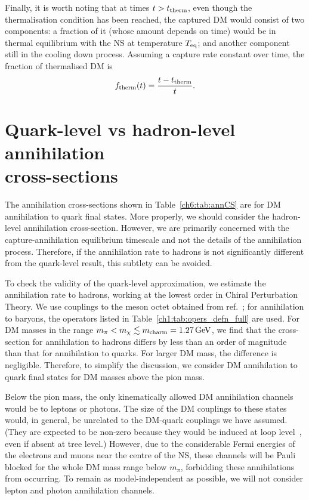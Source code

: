 Finally, it is worth noting that at times  $t>t_{\rm therm}$, even though the thermalisation condition has been reached, the captured DM would consist of two components: a fraction of it (whose amount depends on time) would be in thermal equilibrium with the NS at temperature $T_{\rm eq}$; and another component still in the cooling down process. Assuming a  capture rate constant over time, the fraction of thermalised DM is 
\begin{equation}
    f_{\rm therm}(t) = \frac{t-t_{\rm therm}}{t}.
\end{equation}




\section[Quark-level vs hadron-level annihilation cross-sections]{Quark-level vs hadron-level annihilation\\cross-sections}
\label{sec:quarkhadron}

The annihilation cross-sections shown in Table~\ref{ch6:tab:annCS} are for DM annihilation to quark final states.  More properly, we should consider the hadron-level annihilation cross-section.
However, we are primarily concerned with the capture-annihilation equilibrium timescale and not the details of the annihilation process. Therefore, if the annihilation rate to hadrons is not significantly different from the quark-level result, this subtlety can be avoided. 

To check the validity of the quark-level approximation, we estimate the annihilation rate to hadrons, working at the lowest order in Chiral Perturbation Theory. We use couplings to the meson octet obtained from  ref.~\cite{Kumar:2018heq_dec_IndirectDetectionSubGeV}; for annihilation to baryons, the operators listed in Table~\ref{ch1:tab:opers_defn_full} are used. 
For DM masses in the range $m_\pi < m_\chi \lesssim m_{\rm charm} = 1.27{\rm \,GeV}$, we find that the cross-section for annihilation to hadrons differs by less than an order of magnitude than that for annihilation to quarks. For larger DM mass, the difference is negligible. Therefore, to simplify the discussion, we consider DM annihilation to quark final states for DM masses above the pion mass.


Below the pion mass, the only kinematically allowed DM annihilation channels would be to leptons or photons. The size of the DM couplings to these states would, in general, be unrelated to the DM-quark couplings we have assumed. (They are expected to be non-zero because they would be induced at loop level~\cite{Bell:2019pyc_jun_CaptureLeptophilicDark}, even if absent at tree level.)
However, due to the considerable Fermi energies of the electrons and muons near the centre of the NS, these channels will be Pauli blocked for the whole DM mass range below $m_\pi$, forbidding these annihilations from occurring. To remain as model-independent as possible, we will not consider lepton and photon annihilation channels.


